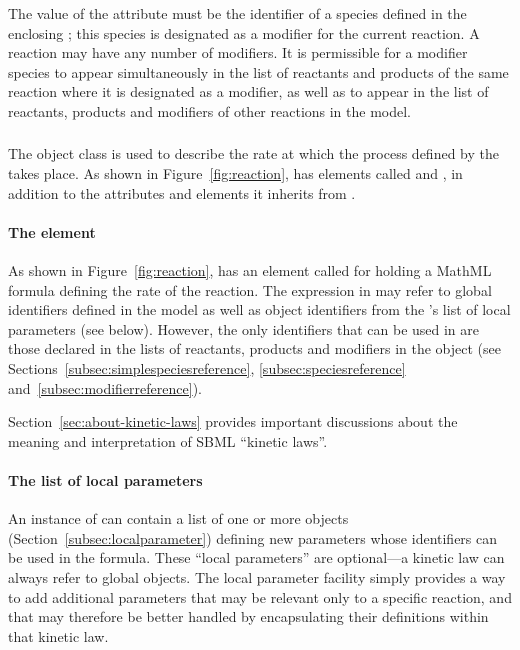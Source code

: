 The value of the  attribute must be the identifier of a
species defined in the enclosing \Model; this species is
designated as a modifier for the current reaction.  A reaction may
have any number of modifiers.  It is permissible for a modifier
species to appear simultaneously in the list of reactants and
products of the same reaction where it is designated as a
modifier, as well as to appear in the list of reactants, products
and modifiers of other reactions in the model.


\subsubsection{}
\label{subsec:kinetic-law}
\label{subsec:listoflocalparameters}

The \KineticLaw object class is used to describe the rate at which
the process defined by the \Reaction takes place.  As shown in
Figure~\vref{fig:reaction}, \KineticLaw has elements called
 and , in addition to the
attributes and elements it inherits from \SBase.


\paragraph{The  element}

As shown in Figure~\vref{fig:reaction}, \KineticLaw has an element
called  for holding a MathML formula defining the rate
of the reaction.  The expression in  may refer to
global identifiers defined in the model as well as \LocalParameter object
identifiers from the \KineticLaw's list of local parameters (see
below).  However, the only \Species identifiers that can be used
in  are those declared in the lists of reactants,
products and modifiers in the \Reaction object (see
Sections~\ref{subsec:simplespeciesreference},
\ref{subsec:speciesreference} and~\ref{subsec:modifierreference}).

Section~\ref{sec:about-kinetic-laws} provides important
discussions about the meaning and interpretation of SBML ``kinetic
laws''.


\paragraph{The list of local parameters}

An instance of \KineticLaw can contain a list of one or more
\LocalParameter objects (Section~\ref{subsec:localparameter})
defining new parameters whose identifiers can be used in the
 formula.  These ``local parameters'' are optional---a
kinetic law can always refer to global \Parameter objects.  The
local parameter facility simply provides a way to add additional
parameters that may be relevant only to a specific reaction, and
that may therefore be better handled by encapsulating their
definitions within that kinetic law.

